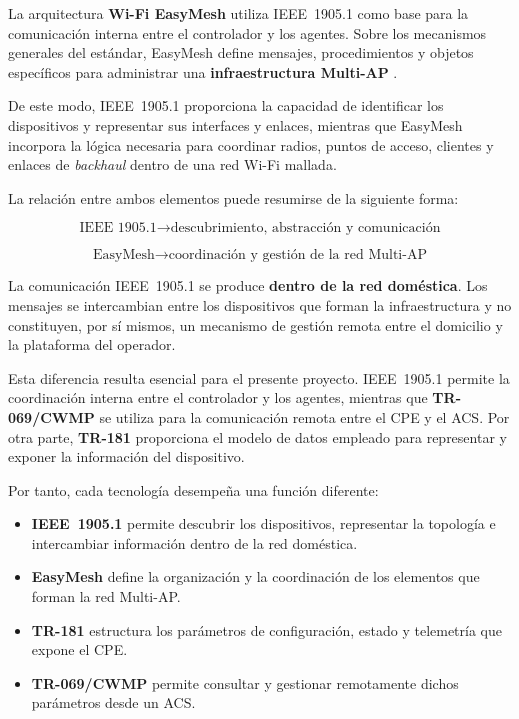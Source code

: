 La arquitectura \textbf{Wi-Fi EasyMesh} utiliza IEEE~1905.1 como base
para la comunicación interna entre el controlador y los agentes. Sobre
los mecanismos generales del estándar, EasyMesh define mensajes,
procedimientos y objetos específicos para administrar una
\textbf{infraestructura Multi-AP}
\cite{wifi_alliance_easymesh,ieee_1905_1}.

De este modo, IEEE~1905.1 proporciona la capacidad de identificar los
dispositivos y representar sus interfaces y enlaces, mientras que
EasyMesh incorpora la lógica necesaria para coordinar radios, puntos de
acceso, clientes y enlaces de \textit{backhaul} dentro de una red Wi-Fi
mallada.

La relación entre ambos elementos puede resumirse de la siguiente forma:

\[
    \text{IEEE~1905.1}
    \longrightarrow
    \text{descubrimiento, abstracción y comunicación}
\]

\[
    \text{EasyMesh}
    \longrightarrow
    \text{coordinación y gestión de la red Multi-AP}
\]

La comunicación IEEE~1905.1 se produce
\textbf{dentro de la red doméstica}. Los mensajes se intercambian entre
los dispositivos que forman la infraestructura y no constituyen, por sí
mismos, un mecanismo de gestión remota entre el domicilio y la plataforma
del operador.

Esta diferencia resulta esencial para el presente proyecto. IEEE~1905.1
permite la coordinación interna entre el controlador y los agentes,
mientras que \textbf{TR-069/CWMP} se utiliza para la comunicación remota
entre el CPE y el ACS. Por otra parte, \textbf{TR-181} proporciona el
modelo de datos empleado para representar y exponer la información del
dispositivo.

Por tanto, cada tecnología desempeña una función diferente:

\begin{itemize}
    \item \textbf{IEEE~1905.1} permite descubrir los dispositivos,
    representar la topología e intercambiar información dentro de la red
    doméstica.

    \item \textbf{EasyMesh} define la organización y la coordinación de
    los elementos que forman la red Multi-AP.

    \item \textbf{TR-181} estructura los parámetros de configuración,
    estado y telemetría que expone el CPE.

    \item \textbf{TR-069/CWMP} permite consultar y gestionar remotamente
    dichos parámetros desde un ACS.
\end{itemize}

